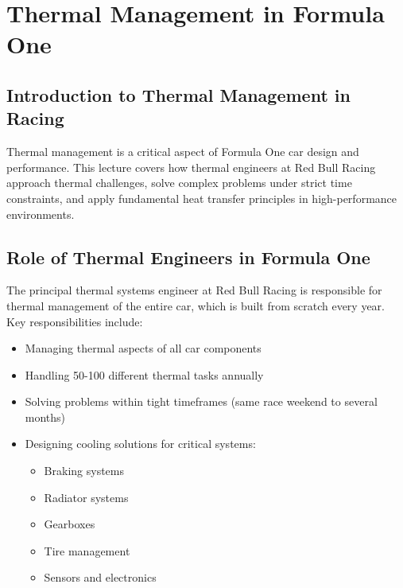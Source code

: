 % 
\section*{Thermal Management in Formula One}

\subsection*{Introduction to Thermal Management in Racing}

Thermal management is a critical aspect of Formula One car design and performance. This lecture covers how thermal engineers at Red Bull Racing approach thermal challenges, solve complex problems under strict time constraints, and apply fundamental heat transfer principles in high-performance environments.

\subsection*{Role of Thermal Engineers in Formula One}

The principal thermal systems engineer at Red Bull Racing is responsible for thermal management of the entire car, which is built from scratch every year. Key responsibilities include:

\begin{itemize}
    \item Managing thermal aspects of all car components
    \item Handling 50-100 different thermal tasks annually
    \item Solving problems within tight timeframes (same race weekend to several months)
    \item Designing cooling solutions for critical systems:
    \begin{itemize}
        \item Braking systems
        \item Radiator systems
        \item Gearboxes
        \item Tire management
        \item Sensors and electronics
    \end{itemize}
\end{itemize}


